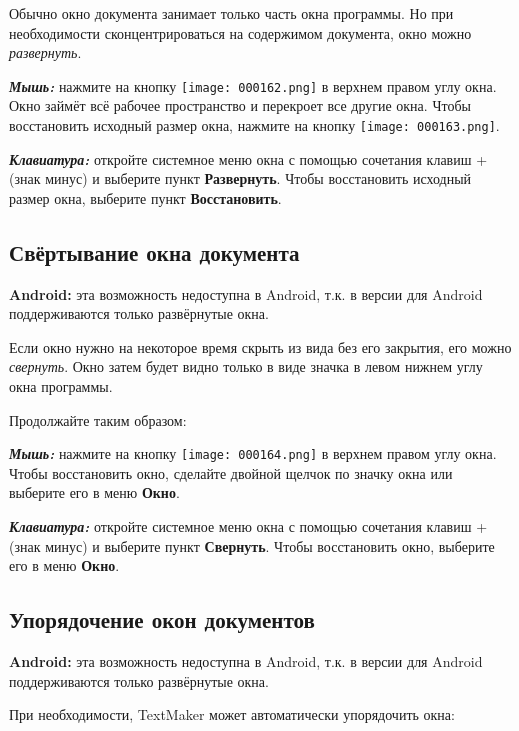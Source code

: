 ﻿\documentclass[a4paper,10pt]{article}
\begin{document}
Обычно окно документа занимает только часть окна программы. Но при необходимости сконцентрироваться на содержимом документа, окно можно \textit{развернуть}.

\textbf{\textit{Мышь:}} нажмите на кнопку \texttt{[image: 000162.png]} в верхнем правом углу окна. Окно займёт всё рабочее пространство и перекроет все другие окна. Чтобы восстановить исходный размер окна, нажмите на кнопку \texttt{[image: 000163.png]}.

\textit{\textbf{Клавиатура:}} откройте системное меню окна с помощью сочетания клавиш +\keys{-} (знак минус) и выберите пункт \textbf{Развернуть}. Чтобы восстановить исходный размер окна, выберите пункт \textbf{Восстановить}.

\subsection{Свёртывание окна документа}
\begin{mdframed}[backgroundcolor=blue!10]
\textbf{Android:} эта возможность недоступна в Android, т.к. в версии для Android поддерживаются только развёрнутые окна.
\end{mdframed}

Если окно нужно на некоторое время скрыть из вида без его закрытия, его можно \textit{свернуть}. Окно затем будет видно только в виде значка в левом нижнем углу окна программы.

Продолжайте таким образом:

\textit{\textbf{Мышь:}} нажмите на кнопку \texttt{[image: 000164.png]} в верхнем правом углу окна. Чтобы восстановить окно, сделайте двойной щелчок по значку окна или выберите его в меню \textbf{Окно}.

\textbf{\textit{Клавиатура:}} откройте системное меню окна с помощью сочетания клавиш +\keys{-} (знак минус) и выберите пункт \textbf{Свернуть}. Чтобы восстановить окно, выберите его в меню \textbf{Окно}.

\subsection{Упорядочение окон документов}
\begin{mdframed}[backgroundcolor=blue!10]
\textbf{Android:} эта возможность недоступна в Android, т.к. в версии для Android поддерживаются только развёрнутые окна.
\end{mdframed}

При необходимости, TextMaker может автоматически упорядочить окна:
\end{document}
